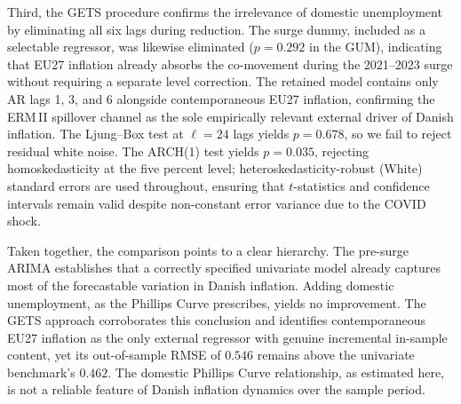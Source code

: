 Third, the GETS procedure confirms the irrelevance of domestic unemployment by eliminating all six lags during reduction. The surge dummy, included as a selectable regressor, was likewise eliminated ($p = 0.292$ in the GUM), indicating that EU27 inflation already absorbs the co-movement during the 2021--2023 surge without requiring a separate level correction. The retained model contains only AR lags 1, 3, and 6 alongside contemporaneous EU27 inflation, confirming the ERM\,II spillover channel as the sole empirically relevant external driver of Danish inflation. The Ljung--Box test at $\ell = 24$ lags yields $p = 0.678$, so we fail to reject residual white noise. The ARCH(1) test yields $p = 0.035$, rejecting homoskedasticity at the five percent level; heteroskedasticity-robust (White) standard errors are used throughout, ensuring that $t$-statistics and confidence intervals remain valid despite non-constant error variance due to the COVID shock. 


Taken together, the comparison points to a clear hierarchy. The pre-surge ARIMA establishes that a correctly specified univariate model already captures most of the forecastable variation in Danish inflation. Adding domestic unemployment, as the Phillips Curve prescribes, yields no improvement. The GETS approach corroborates this conclusion and identifies contemporaneous
EU27 inflation as the only external regressor with genuine incremental in-sample content, yet its out-of-sample RMSE of $0.546$ remains above the univariate benchmark's $0.462$. The domestic Phillips Curve relationship, as estimated here, is not a reliable feature of Danish inflation
dynamics over the sample period.


